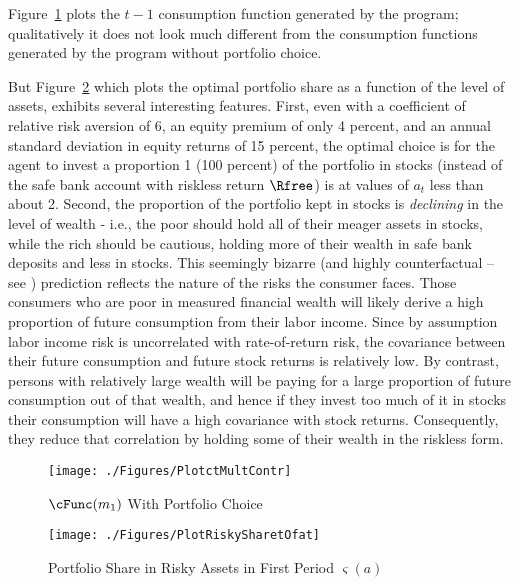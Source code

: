 \documentclass[titlepage, headings=optiontotocandhead]{Resources/texmf-local/tex/latex/econtex}
\begin{document}
Figure~\ref{fig:PlotctMultContr} plots the $t-1$ consumption function generated by the program; qualitatively it does not look much different from the consumption functions generated by the program without portfolio choice.

But Figure~\ref{fig:PlotRiskySharetOfat} which plots the optimal portfolio share as a function of the level of assets, exhibits several interesting features.  First, even with a coefficient of relative risk aversion of 6, an equity premium of only 4 percent, and an annual standard deviation in equity returns of 15 percent, the optimal choice is for the agent to invest a proportion 1 (100 percent) of the portfolio in stocks (instead of the safe bank account with riskless return $\Rfree$) is at values of ${a}_{t}$ less than about 2.  Second, the proportion of the portfolio kept in stocks is \textit{declining} in the level of wealth - i.e., the poor should hold all of their meager assets in stocks, while the rich should be cautious, holding more of their wealth in safe bank deposits and less in stocks.  This seemingly bizarre (and highly counterfactual -- see \cite{carroll:richportfolios}) prediction reflects the nature of the risks the consumer faces.  Those consumers who are poor in measured financial wealth will likely derive a high proportion of future consumption from their labor income.  Since by assumption labor income risk is uncorrelated with rate-of-return risk, the covariance between their future consumption and future stock returns is relatively low.  By contrast, persons with relatively large wealth will be paying for a large proportion of future consumption out of that wealth, and hence if they invest too much of it in stocks their consumption will have a high covariance with stock returns.  Consequently, they reduce that correlation by holding some of their wealth in the riskless form.

\hypertarget{PlotctMultContr}{}
\begin{figure}
  \texttt{[image: ./Figures/PlotctMultContr]}
  \caption{$\cFunc({m}_{1})$ With Portfolio Choice}
  \label{fig:PlotctMultContr}
\end{figure}

\hypertarget{PlotRiskySharetOfat}{}
\begin{figure}
  \texttt{[image: ./Figures/PlotRiskySharetOfat]}
  \caption{Portfolio Share in Risky Assets in First Period $\varsigma({a})$}
  \label{fig:PlotRiskySharetOfat}
\end{figure}
\end{document}
